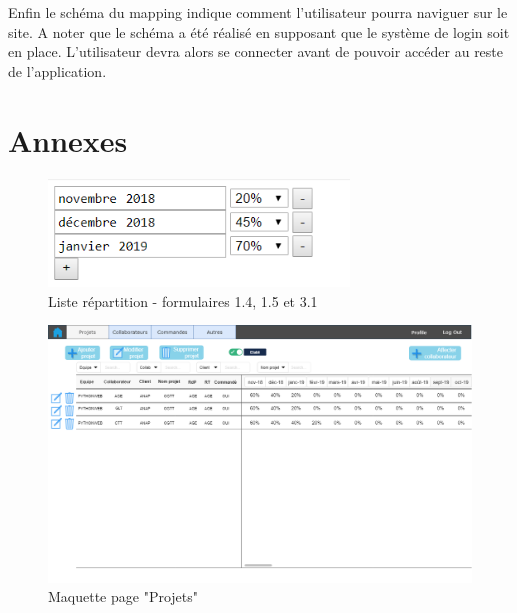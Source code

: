 \documentclass[french]{report}
\begin{document}
  Enfin le schéma du mapping indique comment l’utilisateur pourra naviguer sur
  le site. A noter que le schéma a été réalisé en supposant que le système
  de login soit en place. L’utilisateur devra alors se connecter avant de pouvoir
  accéder au reste de l’application.

\chapter{Annexes}
\label{sec:annexe}

\begin{figure}[h]
  \begin{center}
    \includegraphics[width=8cm]{ex.png}
    \caption{Liste répartition - formulaires 1.4, 1.5 et 3.1}
    \label{fig:liste_repartition}
  \end{center}
\end{figure}

\begin{figure}[h]
  \begin{center}
    \includegraphics[width=\linewidth]{wireframe.png}
    \caption{Maquette page "Projets"}
    \label{fig:wf}
  \end{center}
\end{figure}
\end{document}
